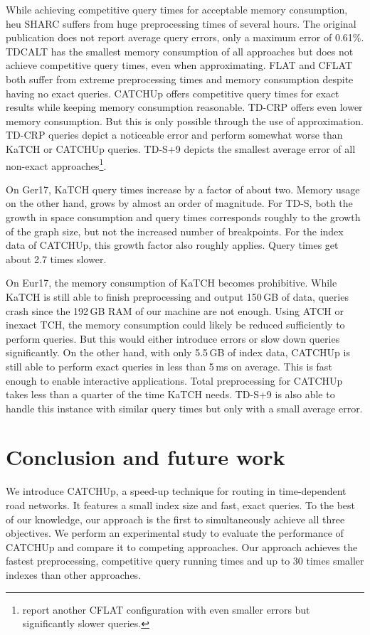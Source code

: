 \documentclass[a4paper,UKenglish,cleveref,autoref]{lipics-v2019}
\newcommand{\tdcch}{CATCHUp}
\begin{document}
While achieving competitive query times for acceptable memory consumption, heu SHARC suffers from huge preprocessing times of several hours.
The original publication does not report average query errors, only a maximum error of 0.61\%.
TDCALT has the smallest memory consumption of all approaches but does not achieve competitive query times, even when approximating.
FLAT and CFLAT both suffer from extreme preprocessing times and memory consumption despite having no exact queries.
\tdcch{} offers competitive query times for exact results while keeping memory consumption reasonable.
TD-CRP offers even lower memory consumption. %
But this is only possible through the use of approximation.
TD-CRP queries depict a noticeable error and perform somewhat worse than KaTCH or \tdcch{} queries.
TD-S+9 depicts the smallest average error of all non-exact approaches\footnote{\cite{kppwz-iotdr-17a} report another CFLAT configuration with even smaller errors but significantly slower queries.}.

On Ger17, KaTCH query times increase by a factor of about two.
Memory usage on the other hand, grows by almost an order of magnitude.
For TD-S, both the growth in space consumption and query times corresponds roughly to the growth of the graph size, but not the increased number of breakpoints.
For the index data of \tdcch{}, this growth factor also roughly applies.
Query times get about 2.7 times slower.

On Eur17, the memory consumption of KaTCH becomes prohibitive.
While KaTCH is still able to finish preprocessing and output 150\,GB of data, queries crash since the 192\,GB RAM of our machine are not enough.
Using ATCH or inexact TCH, the memory consumption could likely be reduced sufficiently to perform queries.
But this would either introduce errors or slow down queries significantly.
On the other hand, with only 5.5\,GB of index data, \tdcch{} is still able to perform exact queries in less than 5\,ms on average.
This is fast enough to enable interactive applications.
Total preprocessing for \tdcch{} takes less than a quarter of the time KaTCH needs. %
TD-S+9 is also able to handle this instance with similar query times but only with a small average error.

\section{Conclusion and future work}\label{sec:conclusion}

We introduce \tdcch{}, a speed-up technique for routing in time-dependent road networks.
It features a small index size and fast, exact queries.
To the best of our knowledge, our approach is the first to simultaneously achieve all three objectives.
We perform an experimental study to evaluate the performance of \tdcch{} and compare it to competing approaches.
Our approach achieves the fastest preprocessing, competitive query running times and up to 30 times smaller indexes than other approaches.
\end{document}
